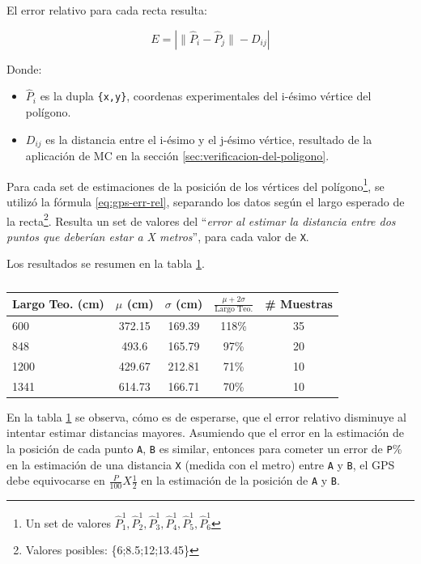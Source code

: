 \documentclass[spanish,12pt,a4paper,titlepage]{report}
\begin{document}
El error relativo para cada recta resulta:

\begin{equation}
  \label{eq:gps-err-rel}
  E = \left|\|\hat{P}_{i} - \hat{P}_{j}\| - D_{ij}\right|
\end{equation}

Donde:
\begin{itemize}
\item $\hat{P}_i$ es la dupla \verb+{x,y}+, coordenas experimentales del i-ésimo vértice del polígono.
\item $D_{ij}$ es la distancia entre el i-ésimo y el j-ésimo vértice, resultado de la aplicación de MC en la sección \ref{sec:verificacion-del-poligono}.
\end{itemize}

Para cada set de estimaciones de la posición de los vértices del polígono\footnote{Un set de valores $\hat{P}_1^1,\hat{P}_2^1,\hat{P}_3^1,\hat{P}_4^1,\hat{P}_5^1,\hat{P}_6^1$}, se utilizó la fórmula \ref{eq:gps-err-rel}, separando los datos según el largo esperado de la recta\footnote{Valores posibles: \{6;8.5;12;13.45\}}. Resulta un set de valores del ``\textit{error al estimar la distancia entre dos puntos que deberían estar a X metros}'', para cada valor de \verb+X+. 

Los resultados se resumen en la tabla \ref{tab:err-rectas}.

\begin{table}[H]
\begin{center}
\begin{tabular}{|p{65pt}|c|c|c|c|}
\hline
\textbf{Largo Teo. (cm)} & $\mu$ (cm) & $\sigma$ (cm)  & $\frac{\mu + 2\sigma}{\text{Largo Teo.}}$ & \textbf{\# Muestras} \\
\hline
\rowcolor[gray]{0.9}
600 & 372.15 & 169.39 & 118\% & 35\\
\hline
\rowcolor[gray]{0.8}
848 & 493.6 & 165.79 & 97\%& 20\\
\hline
\rowcolor[gray]{0.9}
1200 & 429.67 & 212.81 & 71\% & 10\\
\hline
\rowcolor[gray]{0.8}
1341 & 614.73 & 166.71 & 70\% & 10\\
\hline
\end{tabular}
\caption{}
\label{tab:err-rectas}
\end{center}
\end{table}

En la tabla \ref{tab:err-rectas} se observa, cómo es de esperarse, que el error relativo disminuye al intentar estimar distancias mayores. Asumiendo que el error en la estimación de la posición de cada punto \verb+A+, \verb+B+ es similar, entonces para cometer un error de \verb+P+\% en la estimación de una distancia \verb+X+ (medida con el metro) entre \verb+A+ y \verb+B+, el GPS debe equivocarse en $\frac{P}{100}X\frac{1}{2}$ en la estimación de la posición de \verb+A+ y \verb+B+.
\end{document}
